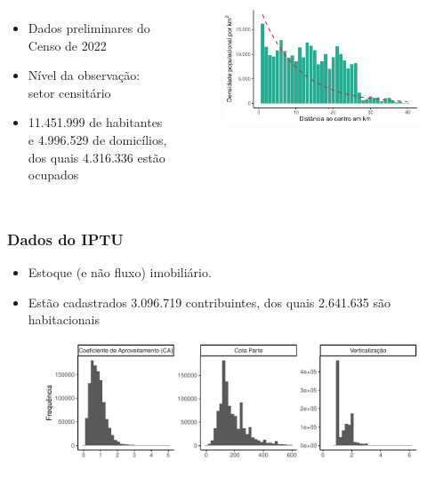 \documentclass[aspectratio=169]{beamer}
\begin{document}
\begin{frame}
\begin{columns}
        \begin{itemize}
            \item Dados preliminares do Censo de 2022
            \item Nível da observação: setor censitário
            \item 11.451.999 de habitantes e 4.996.529 de domicílios, dos quais 4.316.336 estão ocupados
        \end{itemize}
        \begin{figure}
            \centering
            \includegraphics[width = .7\textwidth]{imagens/densidade_distcentro.pdf}
        \end{figure}
        
        
    
    \end{columns}
\end{frame}

\begin{frame}
    \frametitle{Dados do IPTU}
    \begin{itemize}
        \item Estoque (e não fluxo) imobiliário.
        \item Estão cadastrados 3.096.719 contribuintes, dos quais \textcolor{BrickRed}{2.641.635} são habitacionais
    \end{itemize}
    \begin{figure}
        \centering
        \includegraphics[width = .6\textwidth]{imagens/indicadores.pdf}
    \end{figure}
\end{frame}
\end{document}
